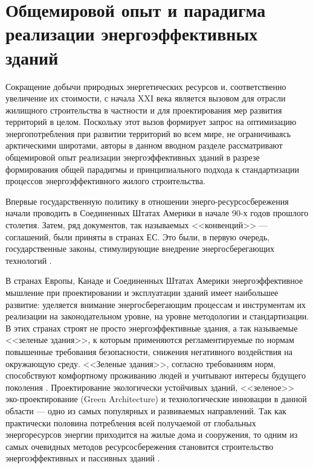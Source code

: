 \section{Общемировой опыт и парадигма реализации энергоэффективных зданий}


Сокращение добычи природных энергетических ресурсов и, соответственно увеличение их стоимости, с начала XXI века является вызовом для отрасли жилищного строительства в частности и
для проектирования мер развития территорий в целом. Поскольку этот вызов формирует запрос на оптимизацию энергопотребления при развитии территорий во всем мире,
не ограничиваясь арктическими широтами, авторы в данном вводном разделе рассматривают общемировой опыт реализации энергоэффективных зданий в разрезе формирования
общей парадигмы и принципиального подхода к стандартизации процессов энергоэффективного жилого строительства.

Впервые государственную политику в отношении энерго-ресурсосбережения начали проводить в Соединенных Штатах Америки в начале 90-х годов прошлого столетия.
Затем, ряд документов, так называемых <<конвенций>> --- соглашений, были приняты в странах ЕС.
Это были, в первую очередь, государственные законы, стимулирующие внедрение энергосберегающих технологий \cite{2010buee_Sormunen_Finland,2020buee_Sheyna_HabitatEurotechInsertion}. %

В странах Европы, Канаде и Соединенных Штатах Америки энергоэффективное мышление при проектировании и эксплуатации зданий имеет наибольшее развитие:
уделяется внимание энергосберегающим процессам и инструментам их реализации на законодательном уровне, на уровне методологии и стандартизации.
В этих странах строят не просто энергоэффективные здания, а так называемые <<зеленые здания>>, к которым применяются регламентируемые по нормам повышенные требования безопасности,
снижения негативного воздействия на окружающую среду.
<<Зеленые здания>>, согласно требованиям норм, способствуют комфортному проживанию людей и учитывают интересы будущего поколения \cite{2020buee_Muhammad_USWastemanagement}.
Проектирование экологически устойчивых зданий, <<зеленое>> эко-проектирование (Green Architecture) \cite{2008buee_wines_green} и технологические инновации в данной области --- одно из самых популярных и
развиваемых направлений.%
Так как практически половина потребления всей получаемой от глобальных энергоресурсов энергии %
приходится на жилые дома и сооружения, то одним из самых очевидных методов ресурсосбережения становится строительство энергоэффективных и пассивных зданий \cite{1979buee_mazria_passive}.





